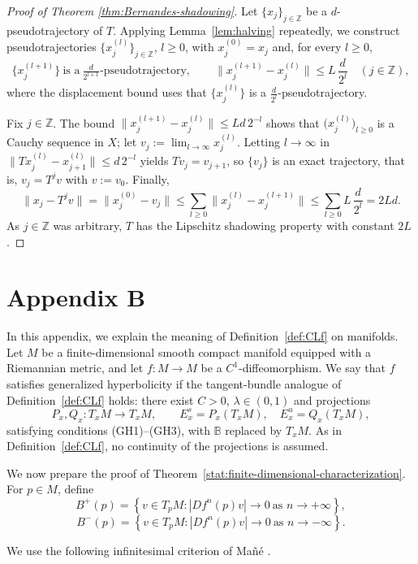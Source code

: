 \documentclass[12pt]{article}
\newcommand{\Bb}{\mathbb{B}}
\newcommand{\Zz}{\mathbb{Z}}
\theoremstyle{definition}
\begin{document}
\begin{proof}[Proof of Theorem \ref{thm:Bernandes-shadowing}]
Let $\{x_j\}_{j \in \Zz}$ be a $d$-pseudotrajectory of $T$. Applying Lemma~\ref{lem:halving} repeatedly, we construct pseudotrajectories $\{x^{(l)}_j\}_{j \in \Zz}$, $l \ge 0$, with $x^{(0)}_j = x_j$ and, for every $l \ge 0$,
$$
\{x^{(l+1)}_j\}\ \text{is a}\ \tfrac{d}{2^{l+1}}\text{-pseudotrajectory}, \qquad \|x^{(l+1)}_j - x^{(l)}_j\| \le L\,\frac{d}{2^{l}} \quad (j \in \Zz),
$$
where the displacement bound uses that $\{x^{(l)}_j\}$ is a $\tfrac{d}{2^{l}}$-pseudotrajectory.

Fix $j \in \Zz$. The bound $\|x^{(l+1)}_j - x^{(l)}_j\| \le Ld\,2^{-l}$ shows that $\big(x^{(l)}_j\big)_{l \ge 0}$ is a Cauchy sequence in $X$; let $v_j := \lim_{l \to \infty} x^{(l)}_j$. Letting $l \to \infty$ in $\|Tx^{(l)}_j - x^{(l)}_{j+1}\| \le d\,2^{-l}$ yields $Tv_j = v_{j+1}$, so $\{v_j\}$ is an exact trajectory, that is, $v_j = T^j v$ with $v := v_0$. Finally,
$$
\|x_j - T^j v\| = \|x^{(0)}_j - v_j\| \le \sum_{l \ge 0} \|x^{(l)}_j - x^{(l+1)}_j\| \le \sum_{l \ge 0} L\,\frac{d}{2^{l}} = 2Ld.
$$
As $j \in \Zz$ was arbitrary, $T$ has the Lipschitz shadowing property with constant $2L$.
\end{proof}


\section*{Appendix B}\label{app:finite-dimensional}

In this appendix, we explain the meaning of Definition~\ref{def:CLf} on manifolds. Let $M$ be a finite-dimensional smooth compact manifold equipped with a Riemannian metric, and let $f:M\to M$ be a $C^1$-diffeomorphism.
We say that $f$ satisfies generalized hyperbolicity if the tangent-bundle analogue of Definition~\ref{def:CLf} holds: there exist $C>0$, $\lambda\in(0,1)$ and projections
\[
P_x,Q_x:T_xM\to T_xM,
\qquad
E_x^s=P_x(T_xM),\quad E_x^u=Q_x(T_xM),
\]
satisfying conditions {\rm(GH1)}--{\rm(GH3)}, with $\Bb$ replaced by
$T_xM$. As in Definition~\ref{def:CLf}, no continuity of the projections is assumed.

We now prepare the proof of Theorem~\ref{stat:finite-dimensional-characterization}.
For $p\in M$, define
\[
B^+(p)=
\left\{
v\in T_pM:
|Df^n(p)v|\to0\ \text{as }n\to+\infty
\right\},
\]
\[
B^-(p)=
\left\{
v\in T_pM:
|Df^n(p)v|\to0\ \text{as }n\to-\infty
\right\}.
\]

We use the following infinitesimal criterion of Mañé \cite{Mane1977}.
\end{document}
